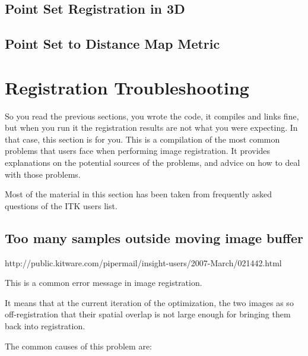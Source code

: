 \ifitkFullVersion

\fi




\subsection{Point Set Registration in 3D}
\label{sec:PointSetRegistrationIn3D}

\ifitkFullVersion

\fi



\subsection{Point Set to Distance Map Metric}
\label{sec:PointSetToDistanceMapMetric}

\ifitkFullVersion

\fi



\section{Registration Troubleshooting}
So you read the previous sections, you wrote the code, it compiles and links fine,
but when you run it the registration results are not what you were expecting.
In that case, this section is for you. This is a compilation of the most common
problems that users face when performing image registration. It provides explanations
on the potential sources of the problems, and advice on how to deal with those problems.

Most of the material in this section has been taken from frequently asked questions of
the ITK users list.


\subsection{Too many samples outside moving image buffer}


http://public.kitware.com/pipermail/insight-users/2007-March/021442.html

This is a common error message in image registration.

It means that at the current iteration of the optimization,
the two images as so off-registration that their spatial
overlap is not large enough for bringing them back into
registration.

The common causes of this problem are:

